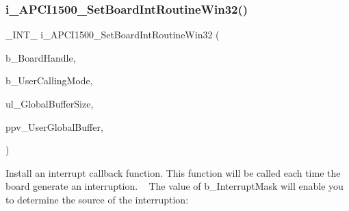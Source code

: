 \subsubsection{\texorpdfstring{i\_APCI1500\_SetBoardIntRoutineWin32()}{i\_APCI1500\_SetBoardIntRoutineWin32()}}
{\footnotesize\ttfamily \+\_\+\+I\+N\+T\+\_\+ i\+\_\+\+A\+P\+C\+I1500\+\_\+\+Set\+Board\+Int\+Routine\+Win32 (\begin{DoxyParamCaption}\item[{B\+Y\+T\+E\+\_\+}]{b\+\_\+\+Board\+Handle,  }\item[{B\+Y\+T\+E\+\_\+}]{b\+\_\+\+User\+Calling\+Mode,  }\item[{U\+L\+O\+N\+G\+\_\+}]{ul\+\_\+\+Global\+Buffer\+Size,  }\item[{V\+O\+ID $\ast$$\ast$}]{ppv\+\_\+\+User\+Global\+Buffer,  }\item[{void(far pascal $\ast$v\+\_\+\+Function\+Name)(B\+Y\+T\+E\+\_\+ b\+\_\+\+Board\+Handle, B\+Y\+T\+E\+\_\+ b\+\_\+\+Interrupt\+Mask, B\+Y\+T\+E\+\_\+ b\+\_\+\+Input\+Channel\+Nbr, B\+Y\+T\+E\+\_\+ b\+\_\+\+User\+Calling\+Mode, V\+O\+ID $\ast$pv\+\_\+\+User\+Shared\+Memory)}]{ }\end{DoxyParamCaption})}

Install an interrupt callback function. This function will be called each time the board generate an interruption. ~\newline
The value of b\+\_\+\+Interrupt\+Mask will enable you to determine the source of the interruption\+:



